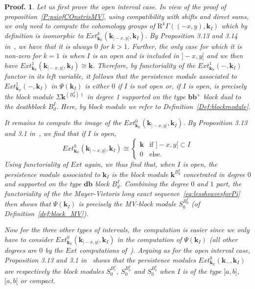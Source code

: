 \documentclass[a4paper, english, 11pt]{article}
\newcommand{\kk}[0]{\textbf{k}}
\newcommand{\0}{\vec{0}}
\newcommand{\R}[0]{\mathbb{R}}
\newcommand{\Rr}[0]{\text{R}}
\newtheorem*{pf}{Proof.} }
\begin{document}
\begin{pf}Let us first prove the open interval case.
In view of the proof of proposition~\ref{P:psiofCOnstrisMV}, using compatibility with shifts and direct sums, we only need to compute the cohomology groups of $\Rr^k\Gamma \left ( (-x,y) , \kk_{I}\right )$ which by definition is isomorphic to 
$Ext^k_{\kk_\R}\left( \kk_{]-x,y[}, \kk_{I }\right) $. 
By Proposition 3.13 and 3.14 in~\cite{Berk18}, we have that it is always $0$ for $k>1$. Further, the only case for which it is non-zero for $k=1$ is when $I$ is an open and is included in $]-x,y[$ and we then have $Ext^1_{\kk_\R}\left( \kk_{]-x,y[}, \kk_{I }\right) \cong \kk $.  Therefore, by functoriality of the $Ext^1_{\kk_\R}( -, \kk_I)$ functor in its left variable, it follows that the persistence module associated to  
$Ext^1_{\kk_\R}( -, \kk_I)$ in $\Psi(\kk_I)$ is either $0$ if $I$ is not open or, if $I$ is open, is precisely the block module $\Sigma \kk^{(B_d^{I})\dag}$ in degree 1 supported on the type $\textbf{bb}^{+}$ block dual to the deathblock $B_d^{I}$. Here, by block module we refer to Definition~\ref{Def:blockmodule}.

It remains to compute the image of the $Ext^0_{\kk_\R}\left( \kk_{]-x,y[}, \kk_{I }\right) $. By Proposition 3.13 and 3.1 in~\cite{Berk18}, we find that if $I$ is open, 
$$Ext^0_{\kk_\R}\left( \kk_{]-x,y[}, \kk_{I }\right) \cong \left \{ \begin{array}{ll}
\kk & \mbox{if } ]-x, y[ \subset I \\ 0 & \mbox{else. }
\end{array}\right .$$
Using functoriality of $Ext$ again, we thus find that, when $I$ is open, the persistence module associated to $\kk_I$ is the block module $ \kk^{B_d^I}$ concetrated in degree $0$ and supported on the type $\textbf{db}$ block $B_d^I$. Combining the degree $0$ and $1$ part, 
the functoriality of the the Mayer-Vietoris long exact sequence~\eqref{eq:lessheavesforPi} then shows that $\Psi(\kk_I) $ is precisely the MV-block module $S_0^{B_d^I}$ (of Definition~\ref{def:block_MV}). 

Now for the three other types of intervals, the computation is easier since we only have to consider $Ext^0_{\kk_\R}\left( \kk_{]-x,y[}, \kk_{I }\right)$ in the computation of $\Psi(\kk_I)$ (all other degrees are $0$ by the $Ext$ computations of~\cite{Berk18}). Arguing as for the open interval case, Proposition 3.13 and 3.1 in~\cite{Berk18} shows that the persistence modules $Ext^0_{\kk_\R}\left( \kk_{-}, \kk_{I }\right)$ are respectively the block modules $S_0^{B_v^I}$, $S_0^{B_h^I}$ and 
$S_0^{B_b^I}$ when $I$ is of the type $]a, b]$, $[a, b[$ or compact. 
\end{pf}
\end{document}
